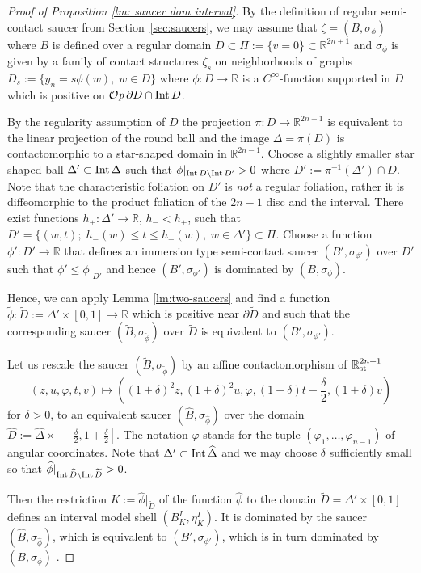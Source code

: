 \documentclass[12pt]{paper}
\theoremstyle{plain}
\theoremstyle{definition}
\newcommand{\wt}{\widetilde}
\newcommand{\wh}{\widehat}
\newcommand{\p}{\partial}
\newcommand{\R}{{\mathbb{R}}}
\newcommand{\st}{{\rm st}}
\newcommand{\Int}{{\rm Int\,}} %
\def\Op{{\mathcal O}{\it p}\,}
\numberwithin{figure}{section}
\begin{document}
\begin{proof}[Proof of Proposition \ref{lm: saucer dom interval}]
By the definition of regular semi-contact saucer from Section~\ref{sec:saucers}, we may assume that $\zeta = (B, \sigma_\phi)$ 
where $B$ is defined over a regular domain $D\subset\Pi:=\{v=0\}\subset\R^{2n+1}$ and $\sigma_\phi$ is given by
a family of contact structures $\zeta_s$ on neighborhoods of graphs $D_s:=\{y_n=s\phi(w),\; w\in D\}$ where $\phi:D\to\R$ is a $C^\infty$-function supported in $D$ which is positive on $\Op\p D\cap\Int D$.

By the regularity assumption of $D$ the projection $\pi:D\to\R^{2n-1}$ is equivalent to the linear 
projection of the round ball and the image $\Delta=\pi(D)$ is contactomorphic to a star-shaped domain in $\R^{2n-1}$. 
Choose a slightly smaller star shaped ball $\Delta'\subset\Int \Delta$ such that
$\phi|_{\Int D \setminus \Int D'}>0$ where $D':=\pi^{-1}(\Delta')\cap D$. Note that the characteristic foliation on $D'$ is \emph{not} a regular foliation, rather it is diffeomorphic to the product foliation of the $2n-1$ disc and the interval. There exist functions $h_\pm:\Delta'\to\R$, $h_-<h_+$, such that $D'=
\{(w,t);\; h_-(w)\leq t\leq h_+(w), \; w\in\Delta'\}\subset\Pi$. Choose a function $\phi':D'\to\R$ that defines an immersion type semi-contact saucer $(B',\sigma_{\phi'})$ over $D'$
such that $\phi'\leq\phi|_{D'}$ and hence $(B',\sigma_{\phi'})$ is dominated by $(B, \sigma_\phi)$.  

Hence, we can apply Lemma \ref{lm:two-saucers} and find a function $\wt\phi:\wt D:=\Delta'\times[0,1]\to\R$ which is positive near $\p \wt D$ and such that the corresponding saucer $(\wt B, \sigma_{\wt\phi})$ over $\wt D$ is equivalent to $(B',\sigma_{\phi'})$.
 
 Let us rescale the saucer $(\wt B,\sigma_{\wt\phi})$ by an affine contactomorphism of $\R^{2n+1}_\st$
 $$(z,u,\varphi, t,v)\mapsto \left((1+\delta)^2z, (1+\delta)^2u, \varphi, (1+\delta) t-\frac\delta2, (1+\delta)v\right)$$
 for $\delta > 0$,
  to an equivalent  saucer $(\wh B, \sigma_{\wh\phi})$ over the domain
 $\wh D:=\wh \Delta\times[-\frac\delta2,1+\frac\delta2]$.
The notation $\varphi$ stands for the tuple $(\varphi_1,\dots,\varphi_{n-1})$ of angular coordinates.
 Note that $\Delta'\subset\Int\wh \Delta$ and we may choose $\delta$ sufficiently small so
  that $\wh\phi|_{\Int\wh D\setminus\Int \wt D}>0$.
   
   Then the restriction  $K:=\wh\phi|_{\wt D} $  of the function $\wh \phi$ to the domain $\wt D=\Delta'\times[0,1]$ defines an interval  model shell $(B^I_K,\eta^I_K)$. It is dominated by the saucer $(\wh B, \sigma_{\wh\phi})$,
   which is equivalent to $(B',\sigma_{\phi'})$, which is in turn dominated by $(B,\sigma_{\phi})$ .
   \end{proof}
\end{document}
